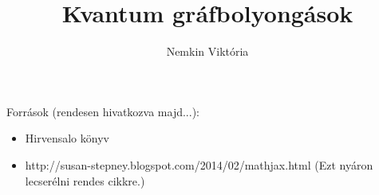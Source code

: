 \documentclass[11pt,a4paper,oneside]{report}
\author{Nemkin Viktória}
\title{Kvantum gráfbolyongások}
\begin{document}

\tableofcontents\vfill
{}








\nocite{*}


Források (rendesen hivatkozva majd...):
\begin{itemize}
  \item Hirvensalo könyv
  \item http://susan-stepney.blogspot.com/2014/02/mathjax.html (Ezt nyáron lecserélni rendes cikkre.)
\end{itemize}


\end{document}

